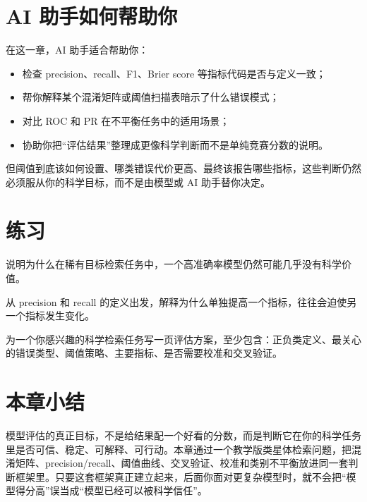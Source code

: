 \section{AI 助手如何帮助你}

在这一章，AI 助手适合帮助你：

\begin{itemize}
    \item 检查 precision、recall、F1、Brier score 等指标代码是否与定义一致；
    \item 帮你解释某个混淆矩阵或阈值扫描表暗示了什么错误模式；
    \item 对比 ROC 和 PR 在不平衡任务中的适用场景；
    \item 协助你把“评估结果”整理成更像科学判断而不是单纯竞赛分数的说明。
\end{itemize}

但阈值到底该如何设置、哪类错误代价更高、最终该报告哪些指标，这些判断仍然必须服从你的科学目标，而不是由模型或 AI 助手替你决定。

\section{练习}

\begin{exercisebox}[基础练习]
说明为什么在稀有目标检索任务中，一个高准确率模型仍然可能几乎没有科学价值。
\end{exercisebox}

\begin{exercisebox}[进阶练习]
从 precision 和 recall 的定义出发，解释为什么单独提高一个指标，往往会迫使另一个指标发生变化。
\end{exercisebox}

\begin{exercisebox}[开放练习]
为一个你感兴趣的科学检索任务写一页评估方案，至少包含：正负类定义、最关心的错误类型、阈值策略、主要指标、是否需要校准和交叉验证。
\end{exercisebox}

\section{本章小结}

模型评估的真正目标，不是给结果配一个好看的分数，而是判断它在你的科学任务里是否可信、稳定、可解释、可行动。本章通过一个教学版类星体检索问题，把混淆矩阵、precision/recall、阈值曲线、交叉验证、校准和类别不平衡放进同一套判断框架里。只要这套框架真正建立起来，后面你面对更复杂模型时，就不会把“模型得分高”误当成“模型已经可以被科学信任”。

